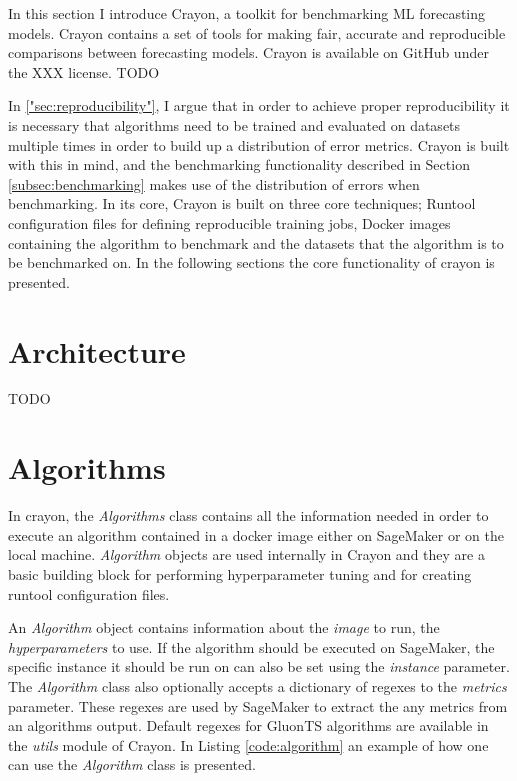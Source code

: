 



\graphicspath{{5/figures/}}

In this section I introduce Crayon, a toolkit for benchmarking ML forecasting models. Crayon contains a set of tools for making fair, accurate and reproducible comparisons between forecasting models. Crayon is available on GitHub under the XXX license. TODO 

In \ref{"sec:reproducibility"}, I argue that in order to achieve proper reproducibility it is necessary that algorithms need to be trained and evaluated on datasets multiple times in order to build up a distribution of error metrics. Crayon is built with this in mind, and the benchmarking functionality described in Section \ref{subsec:benchmarking} makes use of the distribution of errors when benchmarking. In its core, Crayon is built on three core techniques; Runtool configuration files for defining reproducible training jobs, Docker images containing the algorithm to benchmark and the datasets that the algorithm is to be benchmarked on. In the following sections the core functionality of crayon is presented.

\section{Architecture}
TODO

\section{Algorithms}
\label{crayon:algorithms}
In crayon, the \textit{Algorithms} class contains all the information needed in order to execute an algorithm contained in a docker image either on SageMaker or on the local machine. \textit{Algorithm} objects are used internally in Crayon and they are a basic building block for performing hyperparameter tuning and for creating runtool configuration files.

An \textit{Algorithm} object contains information about the \textit{image} to run, the \textit{hyperparameters} to use. If the algorithm should be executed on SageMaker, the specific instance it should be run on can also be set using the \textit{instance} parameter. The \textit{Algorithm} class also optionally accepts a dictionary of regexes to the \textit{metrics} parameter. These regexes are used by SageMaker to extract the any metrics from an algorithms output. Default regexes for GluonTS algorithms are available in the \textit{utils} module of Crayon. In Listing \ref{code:algorithm} an example of how one can use the \textit{Algorithm} class is presented. 

